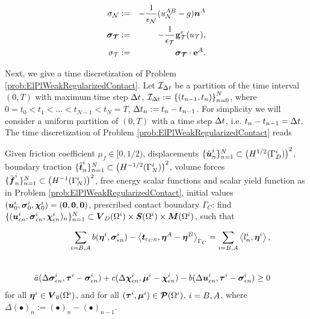 \documentclass[12pt,a4paper]{scrbook}
\begin{document}
\begin{eqnarray}
\sigma_{{\mathcal{N}}}&:=&-\frac{1}{\epsilon_{{\mathcal{N}}}}(u_{{\mathcal{N}}}^{AB}-g)\mbox{\boldmath$n$}^{A}\label{eq:RegularizedContactTractionNormalComponent} \\
\mbox{\boldmath$\sigma_{{\mathcal{T}}}$}&:=&-\frac{1}{\epsilon_{{\mathcal{T}}}}\mbox{\boldmath$\mathrm{g}$}^e_{{\mathcal{T}}}(u_{{\mathcal{T}}}),\label{eq:RegularizedContactTractionTangentComponentVector}\\
\sigma_{{\mathcal{T}}}&:=&\mbox{\boldmath$\sigma_{{\mathcal{T}}}$}\cdot \mbox{\boldmath${\mathrm e}$}^{A}.\label{eq:RegularizedContactTractionTangentComponentScalar}
\end{eqnarray}


Next, we give a time discretization of Problem \ref{prob:ElPlWeakRegularizedContact}. Let ${\mathcal I}_{{\Delta t}}$ be a partition of the time interval $(0,T)$ with maximum time step ${\Delta t}$, ${\mathcal I}_{{\Delta t}}:=\left\lbrace (t_{n-1},t_{n})  \right\rbrace_{n=0}^{N}$, where $0=t_{0}<t_1<\ldots<t_{N-1}<t_{N}=T$, ${\Delta t}_{n}:=t_{n}-t_{n-1}$. For simplicity we will consider a uniform  partition of $(0,T)$ with a time step ${\Delta t}$, i.e. $t_{n}-t_{n-1}={\Delta t}$. The time discretization of Problem \ref{prob:ElPlWeakRegularizedContact} reads
\begin{problem}\label{prob:ElPlWeakRegularizedContactTimeDiscretization}
Given  friction coefficient $\mu_f \in [0,1/2) $, displacements $\{\hat{\mbox{\boldmath$u$}}^i_n\}_{n=1}^{N} \subset \left(H^{1/2}(\Gamma_D^i)\right)^2$, boundary traction 
$\{\hat{\mbox{\boldmath$t$}}^i_n\}_{n=1}^{N}\subset \left(H^{-1/2}(\Gamma_N^i)\right)^2$, volume forces $\{\hat{\mbox{\boldmath$f$}}^i_n\}_{n=1}^{N }\subset\left(H^{-1}(\Gamma_N^i)\right)^2$, free energy scalar functions and   scalar yield  function as in Problem \ref{prob:ElPlWeakRegularizedContact}, initial values $(\mbox{\boldmath$u$}^i_0,\mbox{\boldmath$\sigma$}^{i}_0,\mbox{\boldmath$\chi$}^{i}_0)=(\mbox{\boldmath$0$},\mbox{\boldmath$0$},\mbox{\boldmath$0$})$, prescribed contact boundary $\Gamma_C$: 
find $\{(\mbox{\boldmath$u$}^i_{\epsilon n},\mbox{\boldmath$\sigma$}^{i}_{\epsilon n},\mbox{\boldmath$\chi$}^i_{\epsilon n})_n\}_{n=1}^{N}\subset \mbox{\boldmath$V$}_D(\Omega^i)\times \mbox{\boldmath$S$}(\Omega^i)\times \mbox{\boldmath$M$}(\Omega^i)$, such that

\begin{eqnarray}
\sum \limits_{i=B,A}  b(\mbox{\boldmath$\eta$}^i,\mbox{\boldmath$\sigma$}^i_{\epsilon n})- \left\langle \mbox{\boldmath$t$}_{\epsilon_C n}, \mbox{\boldmath$\eta$}^{A}-\mbox{\boldmath$\eta$}^{B} \right\rangle_{\Gamma_C}    =\sum \limits_{i=B,A}\left\langle l_{n}^{i},\mbox{\boldmath$\eta$}^{i}\right\rangle, & &\label{eq:ElPlContWeakFormMechRegTimeDiscretization}\\[5ex]
 \bar{a}(\Delta \mbox{\boldmath$\sigma$}^i_{\epsilon n},\mbox{\boldmath$\tau$}^i-\mbox{\boldmath$\sigma$}^i_{\epsilon n})+c(\Delta \mbox{\boldmath$\chi$}^i_{\epsilon n},\mbox{\boldmath$\mu$}^i-\mbox{\boldmath$\chi$}^i_{\epsilon n})-b(\Delta \mbox{\boldmath$u$}^i_{\epsilon n},\mbox{\boldmath$\tau$}^i-\mbox{\boldmath$\sigma$}^i_{\epsilon n})\geq 0 &&\label{eq:ElPlContWeakFormPlastRegTimeDiscretization} 
\end{eqnarray}
for all $\mbox{\boldmath$\eta$}^i \in \mbox{\boldmath$V$}_0(\Omega^i) $, and for all $(\mbox{\boldmath$\tau$}^i,\mbox{\boldmath$\mu$}^i)\in \mbox{\boldmath$\mathcal{P}$}(\Omega^i)$, $i=B,A$, where $\Delta (\bullet)_{n}:= (\bullet)_{n}- (\bullet)_{n-1}$.
\end{problem}
\end{document}
